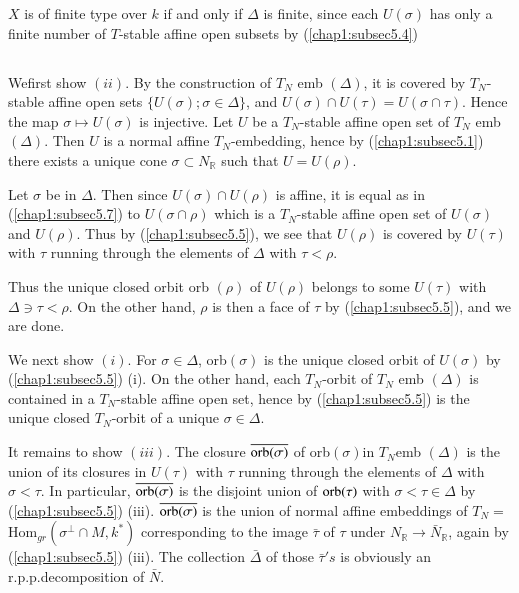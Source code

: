 \noindent
$X$ is of finite type over $k$ if and only if $\Delta$ is finite,
since each $U(\sigma)$ has only a finite number of $T$-stable affine
open subsets by (\ref{chap1:subsec5.4}) 


\subsection{}\label{chap1:subsec5.8}%
\medskip
{}
We\pageoriginale first show $(ii)$. By the construction of $T_N$ emb
$(\Delta)$, it 
is covered by $T_N$-stable affine open sets $\{ U(\sigma) ; \sigma \in
\Delta \}$, and $U(\sigma) \cap U(\tau)= U(\sigma \cap \tau)$. Hence
the map $\sigma \longmapsto U(\sigma)$ is injective. Let $U$ be a
$T_N$-stable affine open set of $T_N$ emb $(\Delta)$. Then $U$ is a
normal affine $T_N$-embedding, hence by (\ref{chap1:subsec5.1}) there
exists a unique 
cone $\sigma \subset N_{\mathbb{R}}$ such that $U= U(\rho)$. 


Let $\sigma$ be in $\Delta$. Then since $U(\sigma) \cap U(\rho)$ is
affine, it is equal as in (\ref{chap1:subsec5.7}) to $U(\sigma \cap
\rho)$ which is a 
$T_N$-stable affine open set of $U(\sigma)$ and $U(\rho)$. Thus by
(\ref{chap1:subsec5.5}), we see that $U(\rho)$ is covered by $U(\tau)$
with $\tau$ 
running through the elements of $\Delta$ with $\tau < \rho$. 

\noindent
Thus the unique closed orbit orb $(\rho)$ of $U(\rho)$ belongs to some
$U(\tau)$ with $\Delta \ni \tau < \rho$. On the other hand, $\rho$ is
then a face of $\tau$ by (\ref{chap1:subsec5.5}), and we are done.  

We next show $(i)$. For $\sigma \in \Delta$, orb$(\sigma) $ is the
unique closed orbit of $U(\sigma)$ by (\ref{chap1:subsec5.5}) (i). On
the other hand, 
each $T_N$-orbit of $T_N$ emb $(\Delta)$ is contained in a
$T_N$-stable affine open set, hence by (\ref{chap1:subsec5.5}) is the
unique closed 
$T_N$-orbit of a unique $\sigma \in \Delta$. 

It remains to show $(iii)$. The closure $\overline{\operatorname{orb}(\sigma)}$ of
orb$(\sigma) $in $T_N$emb $(\Delta)$ is the union of its closures in
$U(\tau)$ with $\tau$ running through the elements of $\Delta$ with
$\sigma < \tau$. In particular, $\overline{\operatorname{orb}(\sigma)}$ is the
disjoint union of $\operatorname{orb}(\tau)$ with $\sigma < \tau \in \Delta$ by
(\ref{chap1:subsec5.5}) (iii). $\overline{\operatorname{orb}(\sigma)}$  is the union of normal
affine embeddings of $T_N =$ Hom$_{gr} (\sigma^{\perp} \cap M,k^*)$
corresponding to the image $\bar{\tau}$ of $\tau$ under
$N_{\mathbb{R}} \to \bar{N}_{\mathbb{R}}$, again by
(\ref{chap1:subsec5.5}) (iii). The 
collection $\bar{\Delta}$ of those $\bar{\tau}'s$ is obviously an
r.p.p.decomposition of $\bar{N}$. 

